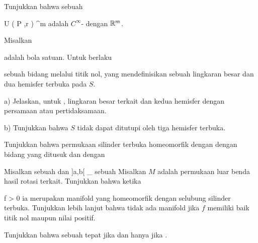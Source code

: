 {}
{

Tunjukkan bahwa sebuah

\mavergleichskette
{\vergleichskette
{ U \left(   P ,r  \right)
}
{ \subseteq }{ \R^m
}
{  }{
}
{    }{
}
{   }{
}
}
{}{}{}
adalah $C^\infty$-
dengan ${\mathbb R}^m$.

}
{} {}

{}
{

Misalkan

 {  }

adalah bola satuan. Untuk
 berlaku

 {  }

sebuah bidang melalui titik nol, yang mendefinisikan sebuah lingkaran besar
 {} {}
dan dua hemisfer terbuka pada $S$.

a) Jelaskan, untuk
, lingkaran besar terkait dan kedua hemisfer dengan persamaan atau pertidaksamaan.

b) Tunjukkan bahwa $S$ tidak dapat ditutupi oleh tiga hemisfer terbuka.

}
{} {}

{}
{

Tunjukkan bahwa permukaan silinder terbuka
\mathl{S^1 \times {]0,1[}}{} homeomorfik dengan
 dengan bidang yang ditusuk
 dan dengan

}
{} {}

{}
{

Misalkan
\mathl{]a,b[}{} sebuah
dan
 {]a,b[} {\R_{}
} {}
sebuah
Misalkan $M$ adalah permukaan luar benda hasil rotasi terkait. Tunjukkan bahwa ketika

\mavergleichskette
{\vergleichskette
{ f
}
{ > }{ 0
}
{  }{
}
{    }{
}
{   }{
}
}
{}{}{}
ia merupakan manifold yang homeomorfik dengan selubung silinder terbuka. Tunjukkan lebih lanjut bahwa tidak ada manifold jika $f$ memiliki baik titik nol maupun nilai positif.

}
{} {}

{}
{

Tunjukkan bahwa sebuah
tepat jika dan hanya jika
.

}
{} {}

